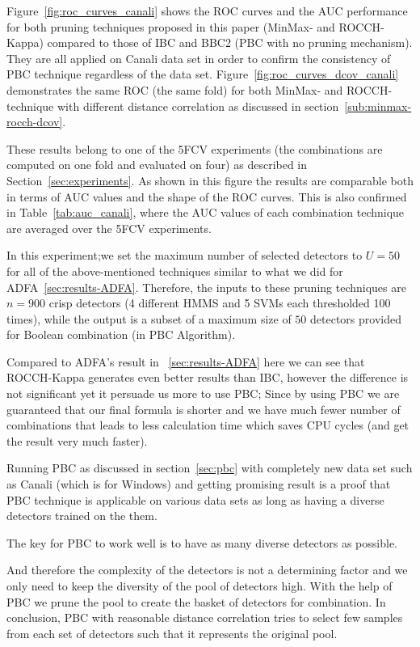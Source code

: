 Figure~\ref{fig:roc_curves_canali} shows the ROC curves and the AUC performance for both pruning techniques proposed in this paper (MinMax- and ROCCH-Kappa) compared to those of IBC and BBC2 (PBC with no pruning mechanism). They are all applied on Canali data set in order to confirm the consistency of PBC technique regardless of the data set. Figure~\ref{fig:roc_curves_dcov_canali} demonstrates the same ROC (the same fold) for both MinMax- and ROCCH- technique with different distance correlation as discussed in section~\ref{sub:minmax-rocch-dcov}.

These results belong to one of the 5FCV experiments (the combinations are computed on one fold and evaluated on four) as described in Section~\ref{sec:experiments}.
As shown in this figure the results are comparable both in terms of AUC values and the shape of the ROC curves.
This is also confirmed in Table~\ref{tab:auc_canali}, where the AUC values of each combination technique are averaged over the 5FCV experiments.

In this experiment;we set the maximum number of selected detectors to $U = 50$ for all of the above-mentioned techniques similar to what we did for ADFA~\ref{sec:results-ADFA}.
Therefore, the inputs to these pruning techniques are $n=900$ crisp detectors (4 different HMMS and 5 SVMs each thresholded 100 times), while the output is a subset of a maximum size of $50$ detectors provided for Boolean combination (in PBC Algorithm).

Compared to ADFA's result in ~\ref{sec:results-ADFA} here we can see that ROCCH-Kappa generates even better results than IBC, however the difference is not significant yet it persuade us more to use PBC; Since by using PBC we are guaranteed that our final formula is shorter and we have much fewer number of combinations that leads to less calculation time which saves CPU cycles (and get the result very much faster).

Running PBC as discussed in section~\ref{sec:pbc} with completely new data set such as Canali (which is for Windows) and getting promising result is a proof that PBC technique is applicable on various data sets as long as having a diverse detectors trained on the them.

The key for PBC to work well is to have as many diverse detectors as possible.

And therefore the complexity of the detectors is not a determining factor and we only need to keep the diversity of the pool of detectors high. With the help of PBC we prune the pool to create the basket of detectors for combination. In conclusion, PBC with reasonable distance correlation tries to select few samples from each set of detectors such that it represents the original pool.


